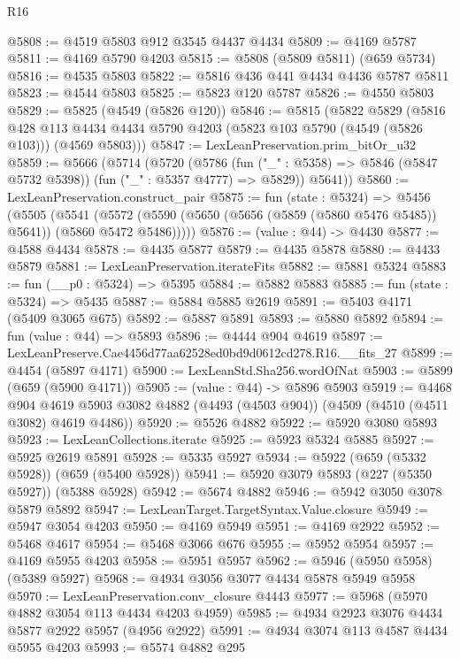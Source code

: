 \begin{lexlean}{R16}
\begin{coremodule}
@5808 := @4519 @5803 @912 @3545 @4437 @4434
@5809 := @4169 @5787
@5811 := @4169 @5790 @4203
@5815 := @5808 (@5809 @5811) (@659 @5734)
@5816 := @4535 @5803
@5822 := @5816 @436 @441 @4434 @4436 @5787 @5811
@5823 := @4544 @5803
@5825 := @5823 @120 @5787
@5826 := @4550 @5803
@5829 := @5825 (@4549 (@5826 @120))
@5846 := @5815
    (@5822
      @5829
      (@5816
        @428
        @113
        @4434
        @4434
        @5790
        @4203
        (@5823 @103 @5790 (@4549 (@5826 @103)))
        (@4569 @5803)))
@5847 := LexLeanPreservation.prim_bitOr_u32
@5859 := @5666
    (@5714
      (@5720
        (@5786 (fun ("_" : @5358) => @5846 (@5847 @5732 @5398)) (fun ("_" : @5357 @4777) => @5829))
        @5641))
@5860 := LexLeanPreservation.construct_pair
@5875 := fun (state : @5324) =>
  @5456
    (@5505
      (@5541 (@5572 (@5590 (@5650 (@5656 (@5859 (@5860 @5476 @5485)) @5641)) (@5860 @5472 @5486)))))
@5876 := (value : @44) -> @4430
@5877 := @4588 @4434
@5878 := @4435 @5877
@5879 := @4435 @5878
@5880 := @4433 @5879
@5881 := LexLeanPreservation.iterateFits
@5882 := @5881 @5324
@5883 := fun (__p0 : @5324) => @5395
@5884 := @5882 @5883
@5885 := fun (state : @5324) => @5435
@5887 := @5884 @5885 @2619
@5891 := @5403 @4171 (@5409 @3065 @675)
@5892 := @5887 @5891
@5893 := @5880 @5892
@5894 := fun (value : @44) => @5893
@5896 := @4444 @904 @4619
@5897 := LexLeanPreserve.Cae4456d77aa62528ed0bd9d0612cd278.R16.__fits_27
@5899 := @4454 (@5897 @4171)
@5900 := LexLeanStd.Sha256.wordOfNat
@5903 := @5899 (@659 (@5900 @4171))
@5905 := (value : @44) -> @5896 @5903
@5919 := @4468
    @904
    @4619
    @5903
    @3082
    @4882
    (@4493 (@4503 @904))
    (@4509 (@4510 (@4511 @3082) @4619 @4486))
@5920 := @5526 @4882
@5922 := @5920 @3080 @5893
@5923 := LexLeanCollections.iterate
@5925 := @5923 @5324 @5885
@5927 := @5925 @2619 @5891
@5928 := @5335 @5927
@5934 := @5922 (@659 (@5332 @5928)) (@659 (@5400 @5928))
@5941 := @5920 @3079 @5893 (@227 (@5350 @5927)) (@5388 @5928)
@5942 := @5674 @4882
@5946 := @5942 @3050 @3078 @5879 @5892
@5947 := LexLeanTarget.TargetSyntax.Value.closure
@5949 := @5947 @3054 @4203
@5950 := @4169 @5949
@5951 := @4169 @2922
@5952 := @5468 @4617
@5954 := @5468 @3066 @676
@5955 := @5952 @5954
@5957 := @4169 @5955 @4203
@5958 := @5951 @5957
@5962 := @5946 (@5950 @5958) (@5389 @5927)
@5968 := @4934 @3056 @3077 @4434 @5878 @5949 @5958
@5970 := LexLeanPreservation.conv_closure @4443
@5977 := @5968 (@5970 @4882 @3054 @113 @4434 @4203 @4959)
@5985 := @4934 @2923 @3076 @4434 @5877 @2922 @5957 (@4956 @2922)
@5991 := @4934 @3074 @113 @4587 @4434 @5955 @4203
@5993 := @5574 @4882 @295

\end{coremodule}
\end{lexlean}
